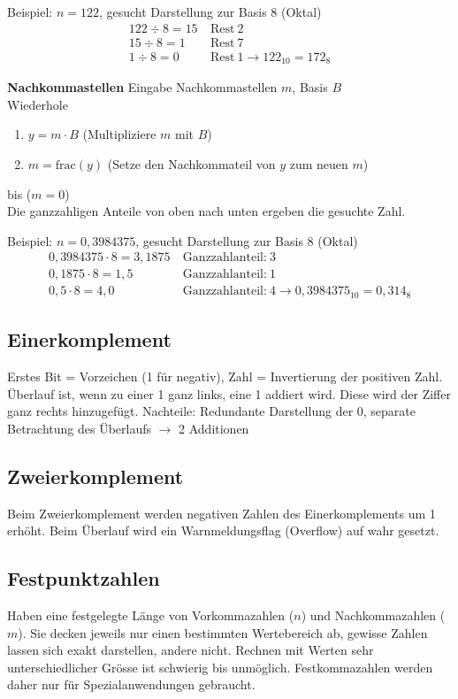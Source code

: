 Beispiel: $n = 122$, gesucht Darstellung zur Basis 8 (Oktal)
\begin{align*}
	122 \div 8 = 15&~\mbox{Rest}~2\\
	15 \div 8 = 1&~\mbox{Rest}~7\\
	1 \div 8 = 0&~\mbox{Rest}~1 \rightarrow 122_{10} = 172_8
\end{align*}

\textbf{Nachkommastellen} Eingabe Nachkommastellen $m$, Basis $B$\\
Wiederhole
\begin{enumerate}
	\item $y = m \cdot B$ (Multipliziere $m$ mit $B$)
	\item $m = \mbox{frac}(y)$ (Setze den Nachkommateil von $y$ zum neuen $m$)
\end{enumerate}
bis ($m = 0$)\\
Die ganzzahligen Anteile von oben nach unten ergeben die gesuchte Zahl.

Beispiel: $n = 0{,}3984375$, gesucht Darstellung zur Basis 8 (Oktal)
\begin{align*}
	0{,}3984375 \cdot 8 = 3{,}1875&~\mbox{Ganzzahlanteil:}~3\\
	0{,}1875 \cdot 8 = 1{,}5&~\mbox{Ganzzahlanteil:}~1\\
	0{,}5 \cdot 8 = 4{,}0&~\mbox{Ganzzahlanteil:}~4 \rightarrow 0{,}3984375_{10} = 0{,}314_8
\end{align*}

\subsection{Einerkomplement}
Erstes Bit = Vorzeichen (1 für negativ), Zahl = Invertierung der positiven Zahl.
Überlauf ist, wenn zu einer 1 ganz links, eine 1 addiert wird. Diese wird der Ziffer ganz rechts hinzugefügt.
Nachteile: Redundante Darstellung der 0, separate Betrachtung des Überlaufs $\rightarrow$ 2 Additionen

\subsection{Zweierkomplement}
Beim Zweierkomplement werden negativen Zahlen des Einerkomplements um 1 erhöht. Beim Überlauf wird ein 
Warnmeldungsflag (Overflow) auf wahr gesetzt.

\subsection{Festpunktzahlen}
Haben eine festgelegte Länge von Vorkommazahlen ($n$) und Nachkommazahlen ($m$).
Sie decken jeweils nur einen bestimmten Wertebereich ab, gewisse Zahlen lassen sich exakt darstellen, andere nicht.
Rechnen mit Werten sehr unterschiedlicher Grösse ist schwierig bis unmöglich. Festkommazahlen werden daher nur
für Spezialanwendungen gebraucht.

